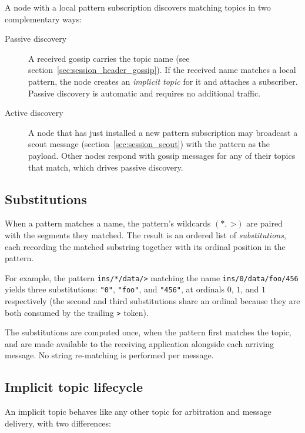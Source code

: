 A node with a local pattern subscription discovers matching topics in two
complementary ways:

\begin{description}
    \item[Passive discovery] A received gossip carries the topic name (see
    section~\ref{sec:session_header_gossip}). If the received name matches a
    local pattern, the node creates an \emph{implicit topic} for it and
    attaches a subscriber. Passive discovery is automatic and requires no
    additional traffic.

    \item[Active discovery] A node that has just installed a new pattern
    subscription may broadcast a scout message
    (section~\ref{sec:session_scout}) with the pattern as the payload. Other
    nodes respond with gossip messages for any of their topics that match,
    which drives passive discovery.
\end{description}

\subsection{Substitutions}

When a pattern matches a name, the pattern's wildcards $(\texttt{*},\ \texttt{>})$
are paired with the segments they matched. The result is an ordered list of
\emph{substitutions}, each recording the matched substring together with its
ordinal position in the pattern.

\begin{remark}
    For example, the pattern \texttt{ins/*/data/>} matching the name
    \texttt{ins/0/data/foo/456} yields three substitutions:
    \verb|"0"|, \verb|"foo"|, and \verb|"456"|, at ordinals $0$, $1$, and $1$
    respectively (the second and third substitutions share an ordinal
    because they are both consumed by the trailing \texttt{>} token).
\end{remark}

The substitutions are computed once, when the pattern first matches the
topic, and are made available to the receiving application alongside each
arriving message. No string re-matching is performed per message.

\subsection{Implicit topic lifecycle}

An implicit topic behaves like any other topic for arbitration and message
delivery, with two differences:

